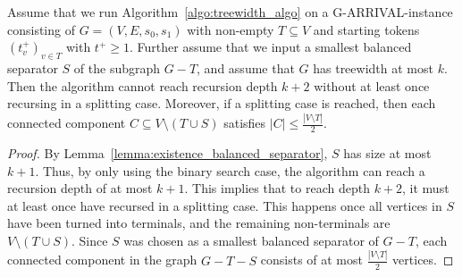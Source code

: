 \documentclass[a4paper,UKenglish,cleveref, autoref, thm-restate]{lipics-v2021}
\newcommand{\problem}[1]{\textrm{#1}}
\newcommand{\garrival}{\problem{G-ARRIVAL}}
\begin{document}
\begin{lemma}
\label{lemma:splitting_soon}
    Assume that we run Algorithm~\ref{algo:treewidth_algo} on a \garrival-instance consisting of $G = (V, E, s_0, s_1)$ with non-empty $T \subseteq V$ and starting tokens $(t^+_v)_{v \in T}$ with $t^+ \geq 1$. Further assume that we input a smallest balanced separator $S$ of the subgraph $G - T$, and assume that $G$ has treewidth at most $k$. 
    Then the algorithm cannot reach recursion depth $k + 2$ without at least once recursing in a splitting case. Moreover, if a splitting case is reached, then each connected component $C \subseteq V \setminus (T \cup S)$ satisfies $|C| \leq \frac{|V \setminus T|}{2}$.
\end{lemma}
\begin{proof}
    By Lemma~\ref{lemma:existence_balanced_separator}, $S$ has size at most $k + 1$. Thus, by only using the binary search case, the algorithm can reach a recursion depth of at most $k + 1$. This implies that to reach depth $k + 2$, it must at least once have recursed in a splitting case. This happens once all vertices in $S$ have been turned into terminals, and the remaining non-terminals are $V \setminus (T \cup S)$. Since $S$ was chosen as a smallest balanced separator of $G - T$, each connected component in the graph $G - T - S$ consists of at most $\frac{|V \setminus T|}{2}$ vertices.
\end{proof}
\end{document}
